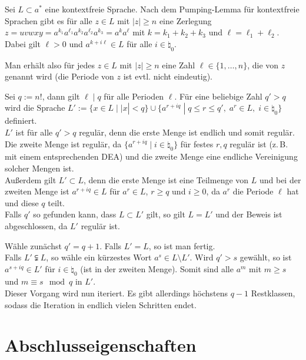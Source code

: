 \begin{Beweis}
    Sei $L \subset a^\ast$ eine kontextfreie Sprache.
    Nach dem Pumping-Lemma für kontextfreie Sprachen gibt es für alle
    $z \in L$ mit $|z| \ge n$ eine Zerlegung $z = uvwxy =
    a^{k_1} a^{\ell_1} a^{k_2} a^{\ell_2} a^{k_3} = a^k a^\ell$ mit
    $k = k_1 + k_2 + k_3$ und $\ell = \ell_1 + \ell_2$.
    Dabei gilt $\ell > 0$ und $a^{k + i\ell} \in L$ für alle
    $i \in \natural_0$.

    Man erhält also für jedes $z \in L$ mit $|z| \ge n$ eine Zahl
    $\ell \in \{1, \dotsc, n\}$, die  von $z$ genannt wird
    (die Periode von $z$ ist evtl. nicht eindeutig).

    Sei $q := n!$, dann gilt $\ell \;|\; q$ für alle Perioden $\ell$.
    Für eine beliebige Zahl $q' > q$ wird die Sprache
    $L' := \{x \in L \;|\; |x| < q\} \cup \{a^{r + iq} \;|\;
    q \le r \le q',\; a^r \in L,\; i \in \natural_0\}$ definiert.\\
    $L'$ ist für alle $q' > q$ regulär, denn
    die erste Menge ist endlich und somit regulär.
    Die zweite Menge ist regulär, da $\{a^{r + iq} \;|\; i \in \natural_0\}$
    für festes $r, q$ regulär ist (z.\,B. mit einem entsprechenden DEA)
    und die zweite Menge eine endliche Vereinigung solcher Mengen ist.\\
    Außerdem gilt $L' \subset L$, denn die erste Menge ist eine Teilmenge von
    $L$ und bei der zweiten Menge ist $a^{r + iq} \in L$ für $a^r \in L$,
    $r \ge q$ und $i \ge 0$, da $a^r$ die Periode $\ell$ hat und diese $q$
    teilt.\\
    Falls $q'$ so gefunden kann, dass $L \subset L'$ gilt, so gilt
    $L = L'$ und der Beweis ist abgeschlossen, da $L'$ regulär ist.

    Wähle zunächst $q' = q + 1$.
    Falls $L' = L$, so ist man fertig.\\
    Falls $L' \subsetneqq L$, so wähle ein kürzestes Wort
    $a^s \in L \setminus L'$.
    Wird $q' > s$ gewählt, so ist $a^{s + iq} \in L'$ für $i \in \natural_0$
    (ist in der zweiten Menge).
    Somit sind alle $a^m$ mit $m \ge s$ und $m \equiv s \mod q$ in $L'$.\\
    Dieser Vorgang wird nun iteriert.
    Es gibt allerdings höchstens $q - 1$ Restklassen, sodass die Iteration in
    endlich vielen Schritten endet.
\end{Beweis}

\pagebreak

\section{%
    Abschlusseigenschaften%
}

